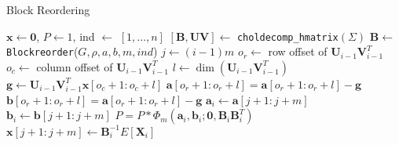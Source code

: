 \begin{frame}{Block Reordering}
\begin{algorithm}[H]
	\caption{Hierarchical-block conditioning algorithm with Block Reordering}
	\begin{algorithmic}
		\tiny
		\State $\mathbf{x} \leftarrow \mathbf{0}$, $P \leftarrow 1$, ind $\leftarrow$ $[1,\dots, n]$
		\State $[\mathbf{B}, \mathbf{UV}] \leftarrow$ \texttt{choldecomp\_hmatrix}$(\Sigma)$
		\State $\mathbf{B} \leftarrow$ \texttt{Blockreorder}($G, \rho, a, b, m, ind$)
		\State $j \leftarrow (i-1)m$
		\State $o_r \leftarrow$ row offset of $\mathbf{U}_{i-1}\mathbf{V}_{i-1}^T$
		\State $o_c \leftarrow$ column offset of $\mathbf{U}_{i-1}\mathbf{V}_{i-1}^T$
		\State $l \leftarrow \dim(\mathbf{U}_{i-1}\mathbf{V}_{i-1}^T)$
		\State $\mathbf{g} \leftarrow \mathbf{U}_{i-1}\mathbf{V}_{i-1}^T\mathbf{x}[o_c+1:o_c+l]$
		\State $\mathbf{a}[o_r+1:o_r+l] = \mathbf{a}[o_r+1:o_r+l] - \mathbf{g}$
		\State $\mathbf{b}[o_r+1:o_r+l] = \mathbf{a}[o_r+1:o_r+l] - \mathbf{g}$
		\EndIf
		\State $\mathbf{a}_i \leftarrow \mathbf{a}[j+1:j+m]$
		\State $\mathbf{b}_i \leftarrow \mathbf{b}[j+1:j+m]$
		\State $P = P*\Phi_m(\mathbf{a}_i, \mathbf{b}_i; \mathbf{0}, \mathbf{B}_i\mathbf{B}_i^T)$
		\State $\mathbf{x}[j+1:j+m] \leftarrow \mathbf{B}_{i}^{-1} E[\mathbf{X}_i]$
		\EndFor
		\EndProcedure
	\end{algorithmic}\label{alg:hmvn_bro}
\end{algorithm}

\end{frame}